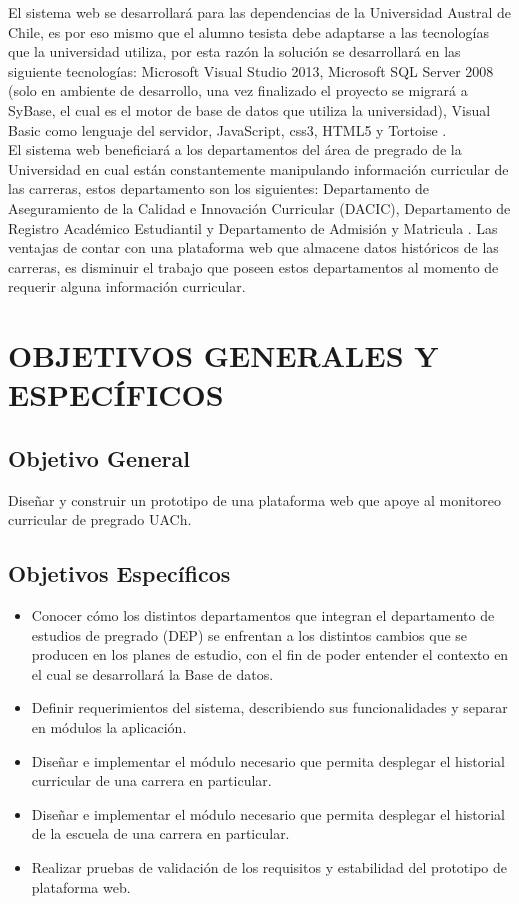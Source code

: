 \documentclass[12pt]{article}
\begin{document}
			
			El sistema web se desarrollará para las dependencias de la Universidad Austral de Chile, es por eso mismo que el alumno tesista debe adaptarse a las tecnologías que la universidad utiliza, por esta razón la solución se desarrollará en las siguiente tecnologías: Microsoft Visual Studio 2013, Microsoft SQL Server 2008 (solo en ambiente de desarrollo, una vez finalizado el proyecto se migrará a SyBase, el cual es el motor de base de datos que utiliza la universidad), Visual Basic como lenguaje del servidor, JavaScript, css3, HTML5 y Tortoise .
			\\

			
			El sistema web beneficiará a los departamentos del área de pregrado de la Universidad en cual están constantemente manipulando información curricular de las carreras, estos departamento son los siguientes: Departamento de Aseguramiento de la Calidad e Innovación Curricular (DACIC), Departamento de Registro Académico Estudiantil y  Departamento de Admisión y Matricula . Las ventajas de contar con una plataforma web que almacene datos históricos de las carreras, es disminuir el trabajo que poseen estos departamentos al momento de requerir alguna información curricular.

			
			


\newpage
\section{OBJETIVOS GENERALES Y ESPECÍFICOS}
		\subsection{Objetivo General}
			{\large  Diseñar y construir  un prototipo de una plataforma web que apoye al monitoreo curricular de pregrado UACh.}
		\subsection{Objetivos Específicos}
		\begin{large}
			
			\begin{itemize}
				\item Conocer cómo los distintos departamentos que integran el departamento de estudios de pregrado (DEP) se enfrentan a los distintos cambios que se producen en los planes de estudio, con el fin de poder entender el contexto en el cual se desarrollará la Base de datos.
				\item  Definir requerimientos del sistema, describiendo sus funcionalidades y separar en módulos la aplicación.
				\item Diseñar e implementar el módulo necesario que permita desplegar el historial curricular de una carrera en particular.
				\item Diseñar e implementar el módulo necesario que permita desplegar el historial de la escuela de una carrera en particular.
				\item Realizar pruebas de validación de los requisitos y estabilidad del prototipo de
plataforma web.
			\end{itemize}
		\end{large}
		\newpage
		
\end{document}
